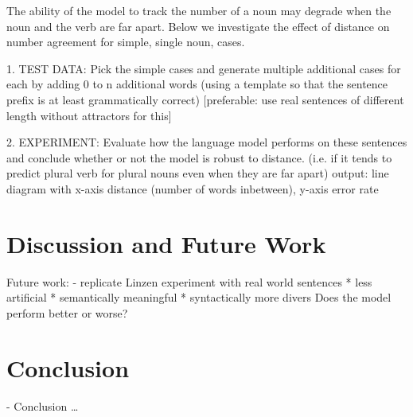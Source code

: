 \documentclass[twoside]{article}
\begin{document}
\begin{multicols}{2}
The ability of the model to track the number of a noun may degrade
when the noun and the verb are far apart.
Below we investigate the effect of distance on number agreement for simple,
single noun, cases.

1. TEST DATA:
Pick the simple cases and generate multiple additional cases for each by adding 0 to n additional words (using a template so that the sentence prefix is at least grammatically correct)
[preferable: use real sentences of different length without attractors for this]

2. EXPERIMENT:
Evaluate how the language model performs on these sentences 
and conclude whether or not the model is robust to distance. 
(i.e. if it tends to predict plural verb for plural nouns even when they are far apart)
output: line diagram with x-axis distance (number of words inbetween), y-axis error rate





\section{Discussion and Future Work}
\label{discussion}

Future work: 
- replicate Linzen experiment with real world sentences
* less artificial
* semantically meaningful
* syntactically more divers
Does the model perform better or worse?

\section{Conclusion}
\label{conclusion}

- Conclusion \ldots








\end{multicols}

\newpage


\end{document}
